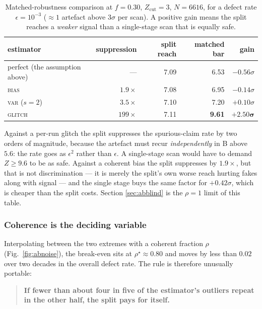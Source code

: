 \begin{table}[htbp]
\centering
\caption{Matched-robustness comparison at $f = 0.30$, $Z_{\mathrm{cut}} = 3$, $N = 6616$, for a
defect rate $\epsilon = 10^{-3}$ ($\approx 1$ artefact above $3\sigma$ per scan). A positive gain
means the split reaches a \emph{weaker} signal than a single-stage scan that is equally safe.}
\label{tab:abnoise}
\begin{tabular}{lrrrr}
\toprule
estimator & suppression & split reach & matched bar & gain \\
\midrule
perfect (the assumption above) & --- & 7.09 & 6.53 & $-0.56\sigma$ \\
\textsc{bias} & $1.9\times$ & 7.08 & 6.95 & $-0.14\sigma$ \\
\textsc{var} ($s = 2$) & $3.5\times$ & 7.10 & 7.20 & $+0.10\sigma$ \\
\textsc{glitch} & $199\times$ & 7.11 & \textbf{9.61} & $\mathbf{+2.50\sigma}$ \\
\bottomrule
\end{tabular}
\end{table}

Against a per-run glitch the split suppresses the spurious-claim rate by two orders of magnitude,
because the artefact must recur \emph{independently} in B above $5.6$: the rate goes as
$\epsilon^2$ rather than $\epsilon$. A single-stage scan would have to demand $Z \ge 9.6$ to be as
safe. Against a coherent bias the split suppresses by $1.9\times$, but that is not discrimination
--- it is merely the split's own worse reach hurting fakes along with signal --- and the single
stage buys the same factor for $+0.42\sigma$, which is cheaper than the split costs. Section
\ref{sec:abblind} is the $\rho = 1$ limit of this table.

\subsubsection*{Coherence is the deciding variable}

Interpolating between the two extremes with a coherent fraction $\rho$ (Fig.~\ref{fig:abnoise}),
the break-even sits at $\rho^\star \approx 0.80$ and moves by less than $0.02$ over two decades in
the overall defect rate. The rule is therefore unusually portable:

\begin{quote}
\textbf{If fewer than about four in five of the estimator's outliers repeat in the other half, the
split pays for itself.}
\end{quote}

